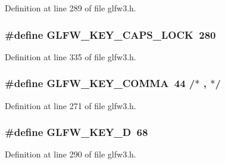 Definition at line 289 of file glfw3.\+h.

\hypertarget{group__keys_ga92c1d2c9d63485f3d70f94f688d48672}{}
\subsubsection[{G\+L\+F\+W\+\_\+\+K\+E\+Y\+\_\+\+C\+A\+P\+S\+\_\+\+L\+O\+C\+K}]{\setlength{\rightskip}{0pt plus 5cm}\#define G\+L\+F\+W\+\_\+\+K\+E\+Y\+\_\+\+C\+A\+P\+S\+\_\+\+L\+O\+C\+K~280}\label{group__keys_ga92c1d2c9d63485f3d70f94f688d48672}


Definition at line 335 of file glfw3.\+h.

\hypertarget{group__keys_gab3d5d72e59d3055f494627b0a524926c}{}
\subsubsection[{G\+L\+F\+W\+\_\+\+K\+E\+Y\+\_\+\+C\+O\+M\+M\+A}]{\setlength{\rightskip}{0pt plus 5cm}\#define G\+L\+F\+W\+\_\+\+K\+E\+Y\+\_\+\+C\+O\+M\+M\+A~44  /$\ast$ , $\ast$/}\label{group__keys_gab3d5d72e59d3055f494627b0a524926c}


Definition at line 271 of file glfw3.\+h.

\hypertarget{group__keys_ga011f7cdc9a654da984a2506479606933}{}
\subsubsection[{G\+L\+F\+W\+\_\+\+K\+E\+Y\+\_\+\+D}]{\setlength{\rightskip}{0pt plus 5cm}\#define G\+L\+F\+W\+\_\+\+K\+E\+Y\+\_\+\+D~68}\label{group__keys_ga011f7cdc9a654da984a2506479606933}


Definition at line 290 of file glfw3.\+h.

